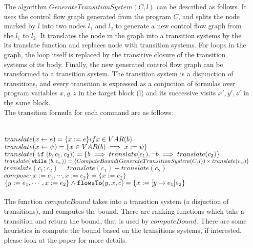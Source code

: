 The algorithm $GenerateTransitionSystem(C,l)$ can be described as follows. It uses the control flow graph generated from the program $C$, and splits the node marked by $l$ into two nodes $l_1$ and $l_2$ to generate a new control flow graph from the $l_1$ to $l_2$. It translates the node in the graph into a transition systems by the its translate function and replaces node with transition systems. For loops in the graph, the loop itself is replaced by the transitive closure of the transition systems of its body. Finally, the new generated control flow graph can be transformed to a transition system. The transition system is a disjunction of transitions, and every transition is expressed as a conjuction of formulas over program variables $x,y,z$ in the target block (l) and its successive visits $x',y',z'$ in the same block.
\\
The transition formula for each command are as follows:
\\
\\
\\
$translate(\mathrel{ x \leftarrow e }) = \{x := e\} if x \in VAR(b)$
\\
$translate(\mathrel{ x \leftarrow \psi }) = \{x \in VAR(b) \implies x := \psi\} $
\\
$translate(\;\mathtt{if}\;(b, c_1, c_2)) = \{b \implies translate(c_1), \neg b \implies translate(c_2)\}$
\\
$translate(\;\mathtt{while}\;(b, c_w)) = \{ ComputeBound(GenerateTransitionSystem(C,l)) \times translate(c_w) \}$
\\
$translate(c_1;c_2) = translate(c_1) + translate(c_2)$
\\
$compose\{x := e_1, \cdots, x := e_2 \} = \{x := e_2\}$
\\
$\{y := e_1, \cdots, x := e_2 \} \land \mathtt{flowsTo}(y, x, c) = \{x := [y \to e_1] e_2\}$
\\
\\
The function $computeBound$ takes into a transition system (a disjuction of transitions), and computes the bound. There are ranking functions which take a transition and return the bound, that is used by $computeBound$. There are some heuristics in compute the bound based on the transitions systems, if interested, please look at the paper for more details.

